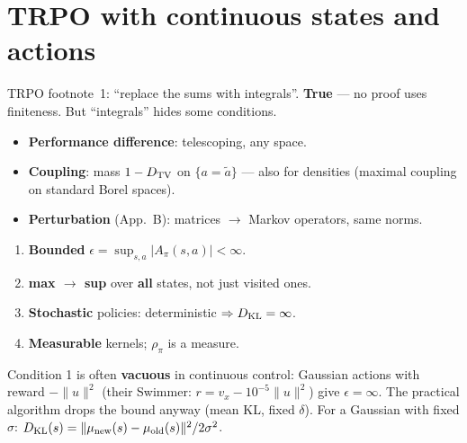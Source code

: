 \section{TRPO with continuous states and actions}
\label{app:trpo-cont}

TRPO footnote~1: ``replace the sums with integrals''. \textbf{True} --- no proof uses finiteness. But ``integrals'' hides some conditions.

\begin{pair}
\begin{keybox}[title={Why it carries over}]
\begin{itemize}
  \item \textbf{Performance difference}: telescoping, any space.
  \item \textbf{Coupling}: mass $1-D_{\mathrm{TV}}$ on $\{a=\tilde a\}$ --- also for densities (maximal coupling on standard Borel spaces).
  \item \textbf{Perturbation} (App.~B): matrices $\to$ Markov operators, same norms.
\end{itemize}
\end{keybox}
\begin{warnbox}[title={What ``integrals'' hides}]
\begin{enumerate}
  \item \textbf{Bounded} $\epsilon=\sup_{s,a}|A_\pi(s,a)|<\infty$.
  \item \textbf{max $\to$ sup} over \textbf{all} states, not just visited ones.
  \item \textbf{Stochastic} policies: deterministic $\Rightarrow D_{\mathrm{KL}}=\infty$.
  \item \textbf{Measurable} kernels; $\rho_\pi$ is a measure.
\end{enumerate}
\end{warnbox}
\end{pair}

\begin{notebox}
Condition 1 is often \textbf{vacuous} in continuous control: Gaussian actions with reward $-\|u\|^2$ (their Swimmer: $r=v_x-10^{-5}\|u\|^2$) give $\epsilon=\infty$. The practical algorithm drops the bound anyway (mean KL, fixed $\delta$). For a Gaussian with fixed $\sigma$: $D_{\mathrm{KL}}(s)=\|\mu_{\mathrm{new}}(s)-\mu_{\mathrm{old}}(s)\|^2/2\sigma^2$.
\end{notebox}

